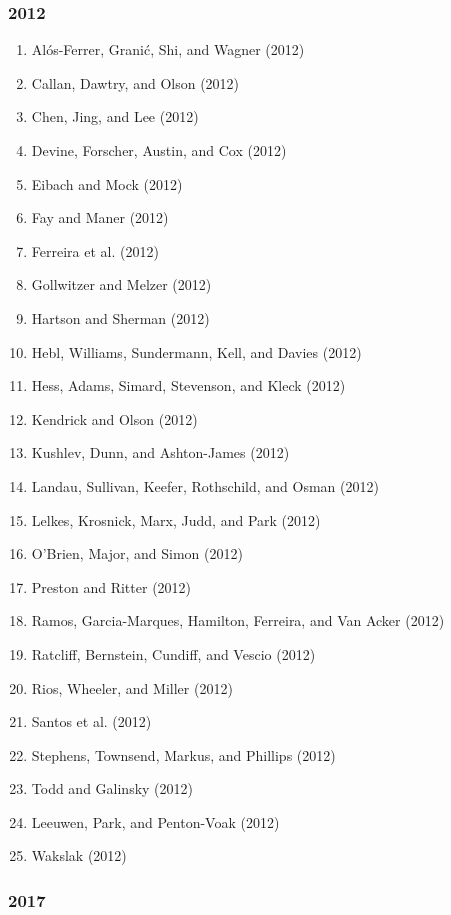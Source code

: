 \documentclass[english,man]{apa6}
\providecommand{\tightlist}{%
  \setlength{\itemsep}{0pt}\setlength{\parskip}{0pt}}
\begin{document}
\subsubsection{2012}\label{section-46}

\begin{enumerate}
\def\labelenumi{\arabic{enumi})}
\tightlist
\item
  Alós-Ferrer, Granić, Shi, and Wagner (2012)
\item
  Callan, Dawtry, and Olson (2012)
\item
  Chen, Jing, and Lee (2012)
\item
  Devine, Forscher, Austin, and Cox (2012)
\item
  Eibach and Mock (2012)
\item
  Fay and Maner (2012)
\item
  Ferreira et al. (2012)
\item
  Gollwitzer and Melzer (2012)
\item
  Hartson and Sherman (2012)
\item
  Hebl, Williams, Sundermann, Kell, and Davies (2012)
\item
  Hess, Adams, Simard, Stevenson, and Kleck (2012)
\item
  Kendrick and Olson (2012)
\item
  Kushlev, Dunn, and Ashton-James (2012)
\item
  Landau, Sullivan, Keefer, Rothschild, and Osman (2012)
\item
  Lelkes, Krosnick, Marx, Judd, and Park (2012)
\item
  O'Brien, Major, and Simon (2012)
\item
  Preston and Ritter (2012)
\item
  Ramos, Garcia-Marques, Hamilton, Ferreira, and Van Acker (2012)
\item
  Ratcliff, Bernstein, Cundiff, and Vescio (2012)
\item
  Rios, Wheeler, and Miller (2012)
\item
  Santos et al. (2012)
\item
  Stephens, Townsend, Markus, and Phillips (2012)
\item
  Todd and Galinsky (2012)
\item
  Leeuwen, Park, and Penton-Voak (2012)
\item
  Wakslak (2012)
\end{enumerate}

\subsubsection{2017}\label{section-47}
\end{document}
